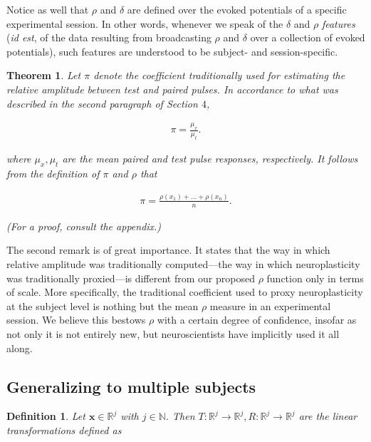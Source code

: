 \documentclass{article}
\newtheorem{definition}{Definition}
\newtheorem{theorem}{Theorem}
\begin{document}
\begin{multicols}{2}
Notice as well that $\rho$ and $\delta$ are defined over the evoked potentials
of a specific experimental session. In other words, whenever we speak of the
$\delta$ and $\rho$ \textit{features} (\textit{id est}, of the data resulting
from broadcasting $\rho$ and $\delta$ over a collection of evoked potentials),
such features are understood to be subject- and session-specific.

\begin{theorem}
    Let $\pi$ denote the coefficient traditionally used for estimating the
    relative amplitude between test and paired pulses. In accordance to what was
    described in the second paragraph of Section $4$,

    \begin{align*}
        \pi = \frac{\mu_x}{\mu_t}
    .\end{align*}

    where $\mu_x, \mu_t$ are the mean paired and test pulse responses,
    respectively. It follows from the definition of $\pi$ and $\rho$ that

    \begin{align*}
        \pi = \frac{\rho(x_1) + \ldots + \rho(x_n)}{n}
    .\end{align*}

    (For a proof, consult the appendix.)
\end{theorem}

The second remark is of great importance. It states that the way in which
relative amplitude was traditionally computed---the way in which neuroplasticity
was traditionally proxied---is different from our proposed $\rho$ function only
in terms of scale. More specifically, the traditional coefficient used to proxy
neuroplasticity at the subject level is nothing but the mean $\rho$
measure in an experimental session. We believe this bestows $\rho$ with a
certain degree of confidence, insofar as not only it is not entirely new, but
neuroscientists have implicitly used it all along.


\subsection{Generalizing to multiple subjects}


\begin{definition}
    Let $\textbf{x} \in \mathbb{R}^j$ with $j \in \mathbb{N}$. Then $T:
    \mathbb{R}^j \to \mathbb{R}^j, R : \mathbb{R}^j \to \mathbb{R}^j$ are the
    linear transformations defined as


\end{definition}
\end{multicols}
\end{document}

